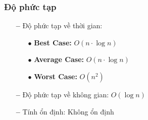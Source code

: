 \subsubsection{Độ phức tạp}
\begin{itemize}
    \item[\textbf{--}]Độ phức tạp về thời gian:
        \begin{itemize}
            \item[$\bullet$] \textbf{Best Case:} $O(n \cdot \log{n})$ 
            \item[$\bullet$] \textbf{Average Case:}  $O(n \cdot \log{n})$
            \item[$\bullet$] \textbf{Worst Case:}  $O(n^2)$
        \end{itemize}
    \item[\textbf{--}]Độ phức tạp về không gian: $O(\log{n})$ 
    \item[\textbf{--}]Tính ổn định: Không ổn định
\end{itemize}

